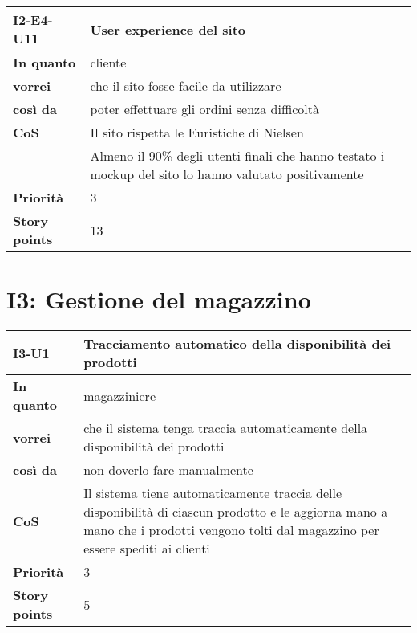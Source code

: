\begin{table}[H]
  \begin{tabularx}{\textwidth}{lX}
    \toprule
    \textbf{I2-E4-U11} & \textbf{User experience del sito} \\
    \midrule
    \textbf{In quanto} & cliente \\
    \textbf{vorrei} & che il sito fosse facile da utilizzare \\
    \textbf{così da} & poter effettuare gli ordini senza difficoltà \\
    \midrule
    \textbf{CoS} & Il sito rispetta le Euristiche di Nielsen \\
    & Almeno il 90\% degli utenti finali che hanno testato i mockup del sito lo hanno valutato positivamente \\
    \midrule
    \textbf{Priorità} & 3 \\
    \textbf{Story points} & 13 \\
    \bottomrule
  \end{tabularx}
  \label{user-story:i2-e4-u11}
\end{table}

\section*{I3: Gestione del magazzino}

\begin{table}[H]
  \begin{tabularx}{\textwidth}{lX}
    \toprule
    \textbf{I3-U1} & \textbf{Tracciamento automatico della disponibilità dei prodotti} \\
    \midrule
    \textbf{In quanto} & magazziniere \\
    \textbf{vorrei} & che il sistema tenga traccia automaticamente della disponibilità dei prodotti \\
    \textbf{così da} & non doverlo fare manualmente \\
    \midrule
    \textbf{CoS} & Il sistema tiene automaticamente traccia delle disponibilità di ciascun prodotto e le aggiorna mano a mano che i prodotti vengono tolti dal magazzino per essere spediti ai clienti \\
    \midrule
    \textbf{Priorità} & 3 \\
    \textbf{Story points} & 5 \\
    \bottomrule
  \end{tabularx}
  \label{user-story:i3-u1}
\end{table}


